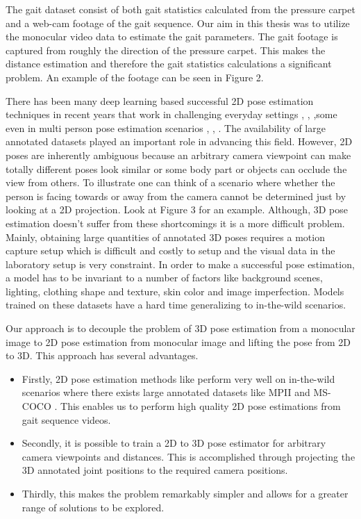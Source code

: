 The gait dataset consist of both gait statistics calculated from the pressure carpet and a web-cam footage of the gait sequence. Our aim in this thesis was to utilize the monocular video data to estimate the gait parameters. The gait footage is captured from roughly the direction of the pressure carpet. This makes the distance estimation and therefore the gait statistics calculations a significant problem. An example of the footage can be seen in Figure 2.

There has been many deep learning based successful 2D pose estimation techniques in recent years that work in challenging everyday settings \parencite{newell2016stacked}, \parencite{chu2017multi}, \parencite{chou2017self} ,some even in multi person pose estimation scenarios \parencite{cao2016realtime}, \parencite{iqbal2017posetrack}, \parencite{insafutdinov2017arttrack}. The availability of large annotated datasets played an important role in advancing this field. However, 2D poses are inherently ambiguous because an arbitrary camera viewpoint can make totally different poses look similar or some body part or objects can occlude the view from others. To illustrate one can think of a scenario where whether the person is facing towards or away from the camera cannot be determined just by looking at a 2D projection. Look at Figure 3 for an example. Although, 3D pose estimation doesn't suffer from these shortcomings it is a more difficult problem. Mainly, obtaining large quantities of annotated 3D poses requires a motion capture setup which is difficult and costly to setup and the visual data in the laboratory setup is very constraint. In order to make a successful pose estimation, a model has to be invariant to a number of factors like background scenes, lighting, clothing shape and texture, skin color and image imperfection. Models trained on these datasets have a hard time generalizing to in-the-wild scenarios.

Our approach is to decouple the problem of 3D pose estimation from a monocular image to 2D pose estimation from monocular image and lifting the pose from 2D to 3D. This approach has several advantages. 
\begin{itemize}
    \item Firstly, 2D pose estimation methods like \parencite{cao2016realtime} perform very well on in-the-wild scenarios where there exists large annotated datasets like MPII \parencite{andriluka14cvpr} and MS-COCO \parencite{lin2014microsoft}. This enables us to perform high quality 2D pose estimations from gait sequence videos.
    \item Secondly, it is possible to train a 2D to 3D pose estimator for arbitrary camera viewpoints and distances. This is accomplished through projecting the 3D annotated joint positions to the required camera positions.
    \item Thirdly, this makes the problem remarkably simpler and allows for a greater range of solutions to be explored.
\end{itemize}

